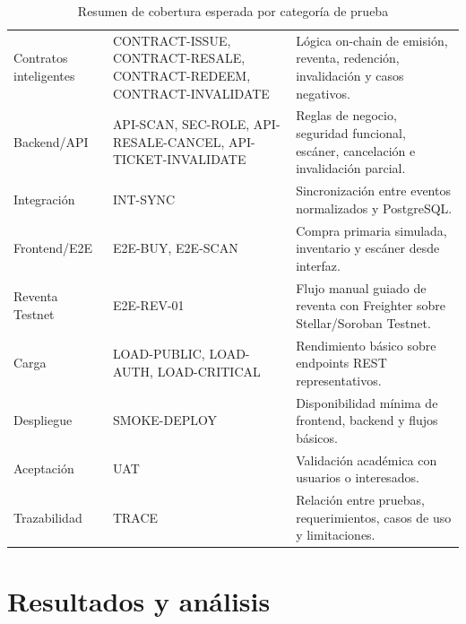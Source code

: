 \documentclass[12pt,letterpaper]{article}
\begin{document}
\begin{table}[H]
\centering
\begingroup
\scriptsize
\setlength{\tabcolsep}{3pt}
\renewcommand{\arraystretch}{1.22}

\begin{tabularx}{\textwidth}{|
>{\raggedright\arraybackslash}p{3.5cm}|
>{\raggedright\arraybackslash}p{4.6cm}|
>{\raggedright\arraybackslash}X|}
\hline
\multicolumn{1}{|>{\centering\arraybackslash}m{3.5cm}|}{\textbf{Categoría}} &
\multicolumn{1}{>{\centering\arraybackslash}m{4.6cm}|}{\textbf{Casos principales}} &
\multicolumn{1}{>{\centering\arraybackslash}m{6.3cm}|}{\textbf{Cobertura esperada}} \\
\hline
Contratos inteligentes & CONTRACT-ISSUE, CONTRACT-RESALE, CONTRACT-REDEEM, CONTRACT-INVALIDATE & Lógica on-chain de emisión, reventa, redención, invalidación y casos negativos. \\
\hline
Backend/API & API-SCAN, SEC-ROLE, API-RESALE-CANCEL, API-TICKET-INVALIDATE & Reglas de negocio, seguridad funcional, escáner, cancelación e invalidación parcial. \\
\hline
Integración & INT-SYNC & Sincronización entre eventos normalizados y PostgreSQL. \\
\hline
Frontend/E2E & E2E-BUY, E2E-SCAN & Compra primaria simulada, inventario y escáner desde interfaz. \\
\hline
Reventa Testnet & E2E-REV-01 & Flujo manual guiado de reventa con Freighter sobre Stellar/Soroban Testnet. \\
\hline
Carga & LOAD-PUBLIC, LOAD-AUTH, LOAD-CRITICAL & Rendimiento básico sobre endpoints REST representativos. \\
\hline
Despliegue & SMOKE-DEPLOY & Disponibilidad mínima de frontend, backend y flujos básicos. \\
\hline
Aceptación & UAT & Validación académica con usuarios o interesados. \\
\hline
Trazabilidad & TRACE & Relación entre pruebas, requerimientos, casos de uso y limitaciones. \\
\hline
\end{tabularx}

\endgroup
\caption{Resumen de cobertura esperada por categoría de prueba}
\label{tab:resumen-cobertura-casos}
\end{table}

\section{Resultados y análisis}
\end{document}

